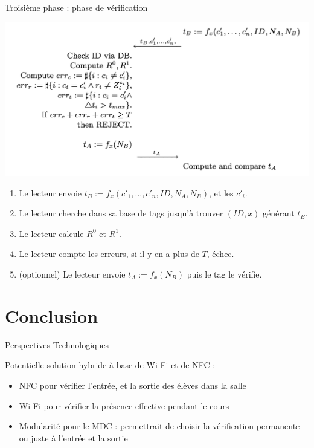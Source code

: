 \documentclass[aspectratio=169]{beamer}
\begin{document}
\begin{frame}{Troisième phase : phase de vérification}
  \begin{multicols}{2}
    \begin{minipage}[c]{\linewidth}
      \centering
      \bigskip
      \bigskip
      \bigskip
      \includegraphics[width=\linewidth]{assets/sk-phase3.png}
    \end{minipage}

    \begin{minipage}[t]{\linewidth}
      \begin{enumerate}
        \item Le lecteur envoie $t_B := f_x(c'_1, \hdots, c'_n, ID, N_A, N_B)$, et les $c'_i$.
        \item Le lecteur cherche dans sa base de tags jusqu'à trouver $(ID, x)$ générant $t_B$.
        \item Le lecteur calcule $R^0$ et $R^1$.
        \item Le lecteur compte les erreurs, si il y en a plus de $T$, échec.
        \item (optionnel) Le lecteur envoie $t_A := f_x(N_B)$ puis le tag le vérifie.
      \end{enumerate}
    \end{minipage}
  \end{multicols}
\end{frame}

\section{Conclusion}

\begin{frame}{Perspectives Technologiques}

Potentielle solution hybride à base de Wi-Fi et de NFC :
\pause
\begin{itemize}
    \item NFC pour vérifier l'entrée, et la sortie des élèves dans la salle
    \pause
    \item Wi-Fi pour vérifier la présence effective pendant le cours
    \pause
    \item Modularité pour le MDC : permettrait de choisir la vérification permanente ou juste à l'entrée et la sortie
\end{itemize}

\end{frame}
\end{document}
